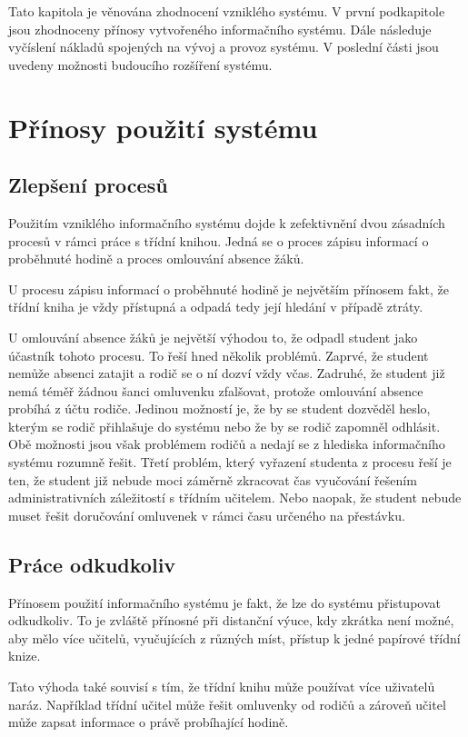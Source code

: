 Tato kapitola je věnována zhodnocení vzniklého systému. V první podkapitole jsou zhodnoceny přínosy vytvořeného informačního systému. Dále následuje vyčíslení nákladů spojených na vývoj a provoz systému. V poslední části jsou uvedeny možnosti budoucího rozšíření systému.

\section{Přínosy použití systému}

\subsection{Zlepšení procesů}
Použitím vzniklého informačního systému dojde k zefektivnění dvou zásadních procesů v rámci práce s třídní knihou. Jedná se o proces zápisu informací o proběhnuté hodině a proces omlouvání absence žáků.

U procesu zápisu informací o proběhnuté hodině je největším přínosem fakt, že třídní kniha je vždy přístupná a odpadá tedy její hledání v případě ztráty.

U omlouvání absence žáků je největší výhodou to, že odpadl student jako účastník tohoto procesu. To řeší hned několik problémů. Zaprvé, že student nemůže absenci zatajit a rodič se o ní dozví vždy včas. Zadruhé, že student již nemá téměř žádnou šanci omluvenku zfalšovat, protože omlouvání absence probíhá z účtu rodiče. Jedinou možností je, že by se student dozvěděl heslo, kterým se rodič přihlašuje do systému nebo že by se rodič zapomněl odhlásit. Obě možnosti jsou však problémem rodičů a nedají se z hlediska informačního systému rozumně řešit. Třetí problém, který vyřazení studenta z procesu řeší je ten, že student již nebude moci záměrně zkracovat čas vyučování řešením administrativních záležitostí s třídním učitelem. Nebo naopak, že student nebude muset řešit doručování omluvenek v rámci času určeného na přestávku.

\subsection{Práce odkudkoliv}
Přínosem použití informačního systému je fakt, že lze do systému přistupovat odkudkoliv. To je zvláště přínosné při distanční výuce, kdy zkrátka není možné, aby mělo více učitelů, vyučujících z různých míst, přístup k jedné papírové třídní knize.

Tato výhoda také souvisí s tím, že třídní knihu může používat více uživatelů naráz. Například třídní učitel může řešit omluvenky od rodičů a zároveň učitel může zapsat informace o právě probíhající hodině.

